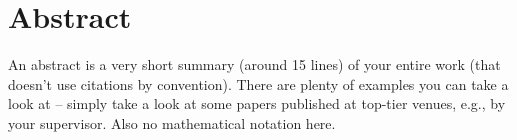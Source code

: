 \chapter*{Abstract}

An abstract is a very short summary (around 15 lines) of your entire work (that doesn't use citations by convention). There are plenty of examples you can take a look at -- simply take a look at some papers published at top-tier venues, e.g., by your supervisor. Also no mathematical notation here.

